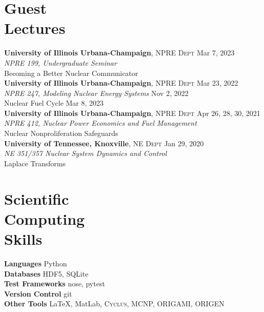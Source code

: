 \documentclass[margin,line]{resume}
\newcommand{\Cyclus}{\textsc{Cyclus}\xspace}%
\begin{document}
\begin{resume}
    \section{\mysidestyle Guest\\Lectures}
    \textbf{University of Illinois Urbana-Champaign}, \textsc{NPRE Dept} \hfill Mar 7, 2023\\
    \textsl{NPRE 199, Undergraduate Seminar} \\
    Becoming a Better Nuclear Communicator \vspace{1.5mm}\\    
    \textbf{University of Illinois Urbana-Champaign}, \textsc{NPRE Dept} \hfill Mar 23, 2022\\
    \textsl{NPRE 247, Modeling Nuclear Energy Systems} \hfill Nov 2, 2022\\
        Nuclear Fuel Cycle \hfill Mar 8, 2023 \vspace{1.5mm}\\
    \textbf{University of Illinois Urbana-Champaign}, \textsc{NPRE Dept} \hfill Apr 26, 28, 30, 2021\\
    \textsl{NPRE 412, Nuclear Power Economics and Fuel Management} \\
        Nuclear Nonproliferation Safeguards \vspace{1.5mm}\\
    \textbf{University of Tennessee, Knoxville}, \textsc{NE Dept} \hfill Jan 29, 2020\\
    \textsl{NE 351/357 Nuclear System Dynamics and Control} \\
        Laplace Transforms
    \section{\mysidestyle Scientific\\Computing\\Skills}
        \textbf{Languages} \hfill Python\vspace{.5mm}\\%
        \textbf{Databases} \hfill HDF5, SQLite\vspace{.5mm}\\%
        \textbf{Test Frameworks} \hfill nose, pytest\vspace{.5mm}\\%
        \textbf{Version Control} \hfill git\vspace{.5mm}\\%
        \textbf{Other Tools} \hfill \LaTeX, MatLab, \Cyclus, MCNP, ORIGAMI, ORIGEN\vspace{.5mm}%

\end{resume}
\end{document}
